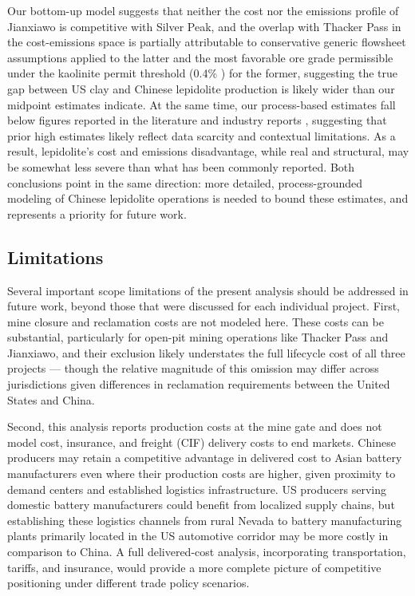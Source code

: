 Our bottom-up model suggests that neither the cost nor the emissions profile of Jianxiawo is competitive with Silver Peak, and the overlap with Thacker Pass in the cost-emissions space is partially attributable to conservative generic flowsheet assumptions applied to the latter and the most favorable ore grade permissible under the kaolinite permit threshold (0.4\% ) for the former, suggesting the true gap between US clay and Chinese lepidolite production is likely wider than our midpoint estimates indicate. At the same time, our process-based estimates fall below figures reported in the literature and industry reports \cite{gaoLithiumExtractionHard2023, atkinsonLithiumPriceReversion2023, liuChinaLithiumBoom2024}, suggesting that prior high estimates likely reflect data scarcity and contextual limitations. As a result, lepidolite's cost and emissions disadvantage, while real and structural, may be somewhat less severe than what has been commonly reported. Both conclusions point in the same direction: more detailed, process-grounded modeling of Chinese lepidolite operations is needed to bound these estimates, and represents a priority for future work.

\subsection{Limitations}\label{sec:04-limitations}

Several important scope limitations of the present analysis should be addressed in future work, beyond those that were discussed for each individual project. First, mine closure and reclamation costs are not modeled here. These costs can be substantial, particularly for open-pit mining operations like Thacker Pass and Jianxiawo, and their exclusion likely understates the full lifecycle cost of all three projects — though the relative magnitude of this omission may differ across jurisdictions given differences in reclamation requirements between the United States and China.

Second, this analysis reports production costs at the mine gate and does not model cost, insurance, and freight (CIF) delivery costs to end markets. Chinese producers may retain a competitive advantage in delivered cost to Asian battery manufacturers even where their production costs are higher, given proximity to demand centers and established logistics infrastructure. US producers serving domestic battery manufacturers could benefit from localized supply chains, but establishing these logistics channels from rural Nevada to battery manufacturing plants primarily located in the US automotive corridor \cite{chengUSIndustrialPolicy2024} may be more costly in comparison to China. A full delivered-cost analysis, incorporating transportation, tariffs, and insurance, would provide a more complete picture of competitive positioning under different trade policy scenarios.

